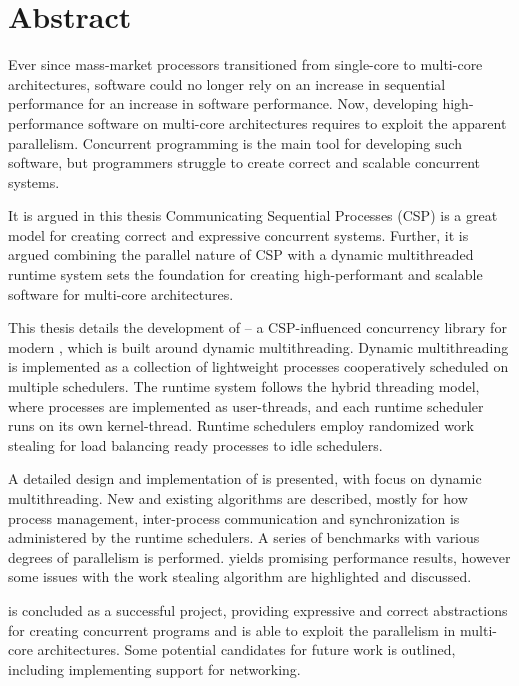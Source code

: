
\newpage
{}
\section*{Abstract}


Ever since mass\hyp{}market processors transitioned from single\hyp{}core to multi\hyp{}core architectures, software could no longer rely on an increase in sequential performance for an increase in software performance. Now, developing high\hyp{}performance software on multi\hyp{}core architectures requires to exploit the apparent parallelism. Concurrent programming is the main tool for developing such software, but programmers struggle to create correct and scalable concurrent systems.

It is argued in this thesis Communicating Sequential Processes (CSP) is a great model for creating correct and expressive concurrent systems. Further, it is argued combining the parallel nature of CSP with a dynamic multithreaded runtime system sets the foundation for creating high\hyp{}performant and scalable software for multi\hyp{}core architectures.

This thesis details the development of \Proxc{} -- a CSP\hyp{}influenced concurrency library for modern \Cpp{}, which is built around dynamic multithreading. Dynamic multithreading is implemented as a collection of lightweight processes cooperatively scheduled on multiple schedulers. The runtime system follows the hybrid threading model, where processes are implemented as user\hyp{}threads, and each runtime scheduler runs on its own kernel\hyp{}thread. Runtime schedulers employ randomized work stealing for load balancing ready processes to idle schedulers.

A detailed design and implementation of \Proxc{} is presented, with focus on dynamic multithreading. New and existing algorithms are described, mostly for how process management, inter\hyp{}process communication and synchronization is administered by the runtime schedulers. A series of benchmarks with various degrees of parallelism is performed. \Proxc{} yields promising performance results, however some issues with the work stealing algorithm are highlighted and discussed.

\Proxc{} is concluded as a successful project, providing expressive and correct abstractions for creating concurrent programs and is able to exploit the parallelism in multi\hyp{}core architectures. Some potential candidates for future work is outlined, including implementing support for networking.

